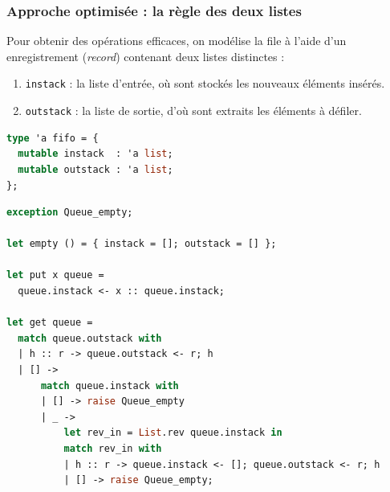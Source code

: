 \documentclass{article}
\begin{document}
\subsubsection{Approche optimisée : la r\`egle des deux listes}

Pour obtenir des opérations efficaces, on modélise la file à l'aide d'un enregistrement (\textit{record}) contenant deux listes distinctes :
\begin{enumerate}
    \item \lstinline|instack| : la liste d'entrée, où sont stockés les nouveaux éléments insérés.
    \item \lstinline|outstack| : la liste de sortie, d'où sont extraits les éléments à défiler.
\end{enumerate}

\begin{lstlisting}[language=Caml]
type 'a fifo = {
  mutable instack  : 'a list;
  mutable outstack : 'a list;
};
\end{lstlisting}


\begin{lstlisting}[language=Caml]
exception Queue_empty;

let empty () = { instack = []; outstack = [] };

let put x queue = 
  queue.instack <- x :: queue.instack;

let get queue =
  match queue.outstack with
  | h :: r -> queue.outstack <- r; h
  | [] ->
      match queue.instack with
      | [] -> raise Queue_empty
      | _ ->
          let rev_in = List.rev queue.instack in
          match rev_in with
          | h :: r -> queue.instack <- []; queue.outstack <- r; h
          | [] -> raise Queue_empty;
\end{lstlisting}
\end{document}
